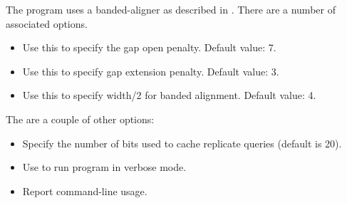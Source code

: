 \documentclass[11pt]{article}
\begin{document}
The program uses a banded-aligner as described in \cite{ChaoPM92}. There are a number of associated options.
\begin{itemize}
\setlength{\itemindent}{30pt}
\item[\itt{--gapOpen}]             Use this to specify the gap open penalty. Default value: 7.
\item[\itt{--gapExtend}]            Use this to specify  gap extension penalty. Default value: 3.
\item[\itt{--band}]                 Use this to specify width/2 for banded alignment. Default value: 4.
\end{itemize}

The are a couple of other options:
\begin{itemize}
\setlength{\itemindent}{30pt}
\item[\itt{--replicateQueryCacheBits}] Specify the number of bits used to cache replicate queries (default is 20).
\item[\itt{--verbose}] Use to run program in verbose mode.
\item[\itt{--help}] Report command-line usage.
\end{itemize}
\end{document}

